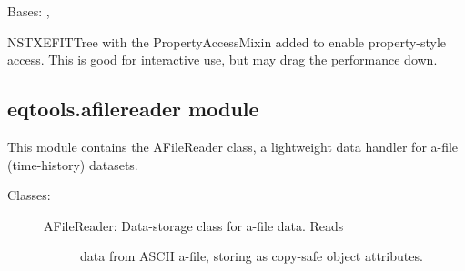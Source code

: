 \documentclass[letterpaper,10pt,english]{sphinxmanual}
\begin{document}
\begin{fulllineitems}
\label{eqtools:eqtools.NSTXEFIT.NSTXEFITTreeProp}
Bases: {\hyperref[eqtools:eqtools.NSTXEFIT.NSTXEFITTree]{}}, {\hyperref[eqtools:eqtools.core.PropertyAccessMixin]{}}

NSTXEFITTree with the PropertyAccessMixin added to enable property-style
access. This is good for interactive use, but may drag the performance down.

\end{fulllineitems}



\subsection{eqtools.afilereader module}
\label{eqtools:eqtools-afilereader-module}\label{eqtools:module-eqtools.afilereader}
This module contains the AFileReader class, a lightweight data
handler for a-file (time-history) datasets.
\begin{description}
\item[{Classes:}] \leavevmode\begin{description}
\item[{AFileReader: Data-storage class for a-file data.  Reads}] \leavevmode
data from ASCII a-file, storing as copy-safe object
attributes.

\end{description}

\end{description}
\end{document}

